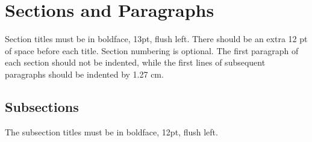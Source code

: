     \section{Sections and Paragraphs}

    Section titles must be in boldface, 13pt, flush left. There should be an extra
    12 pt of space before each title. Section numbering is optional. The first
    paragraph of each section should not be indented, while the first lines of
    subsequent paragraphs should be indented by 1.27 cm.

    \subsection{Subsections}

    The subsection titles must be in boldface, 12pt, flush left.
